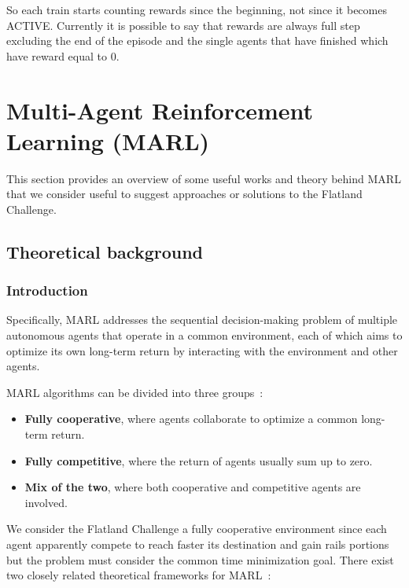 \documentclass[11pt, a4paper, hidelinks]{report}
\begin{document}
So each train starts counting rewards since the beginning, not since it becomes ACTIVE\@.
Currently it is possible to say that rewards are always full step excluding the end of the episode and the single agents that have finished which have reward equal to 0.

\chapter{Multi-Agent Reinforcement Learning (MARL)}\label{ch:multi-agent-reinforcement-learning}

This section provides an overview of some useful works and theory behind MARL that we consider useful to suggest approaches or solutions to the Flatland Challenge.

\section*{Theoretical background}\label{sec:marl-theoretical-background}

\subsection{Introduction}\label{subsec:introduction}

\begin{quoting}[font=itshape, begintext={"}, endtext={"\cite{MARL_definition}}]
Specifically, MARL addresses the sequential decision-making problem of multiple autonomous agents that operate in a common environment, each of which aims to optimize its own long-term return by interacting with the environment and other agents.
\end{quoting}

MARL algorithms can be divided into three groups~\cite{zhang2019multiagent}:

\begin{itemize}
	\item \textbf{Fully cooperative}, where agents collaborate to optimize a common long-term return.
	\item \textbf{Fully competitive}, where the return of agents usually sum up to zero.
	\item \textbf{Mix of the two}, where both cooperative and competitive agents are involved.
\end{itemize}

We consider the Flatland Challenge a fully cooperative environment since each agent apparently compete to reach faster its destination and gain rails portions but the problem must consider the common time minimization goal.
There exist two closely related theoretical frameworks for MARL~\cite{zhang2019multiagent}:
\end{document}
